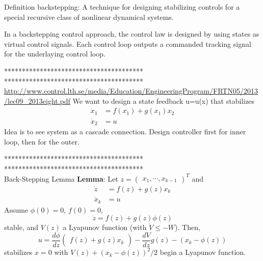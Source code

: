 Definition backstepping: A technique for designing stabilizing controls for a special recursive class of nonlinear dynamical systems.

In a backstepping control approach, the control law is designed by using states as virtual control signals. Each control loop outputs a commanded tracking signal for the underlaying control loop.

***************************************\\


***************************************\\
\url{http://www.control.lth.se/media/Education/EngineeringProgram/FRTN05/2013/lec09_2013eight.pdf}
We want to design a state feedback u=u(x) that stabilizes
\begin{equation}\label{key}
\begin{aligned}
\dot{x}_1&=f(x_1)+g(x_1)x_2\\
\dot{x}_2&=u
\end{aligned}
\end{equation}
Idea is to see system as a cascade connection. Design controller first for inner loop, then for the outer.

***************************************\\


***************************************\\
Back-Stepping Lemma
\textbf{Lemma}: Let $ z=\begin{pmatrix}x_1,\cdots,x_{k-1}\end{pmatrix}^T$ and 
\begin{equation}\label{key}
\begin{aligned}
\dot{z}&=f(z)+g(z)x_k\\
\dot{x}_k&=u
\end{aligned}
\end{equation}
Assume $ \phi(0)=0 $, $ f(0)=0 $,
\begin{equation}\label{key}
\dot{z}=f(z)+g(z)\phi(z)
\end{equation}
stable, and $ V(z) $ a Lyapunov function (with $ \dot{V}\leq-W $). Then, 
\begin{equation}\label{key}
u=\frac{d\phi}{dz}\begin{pmatrix}
f(z)+g(z)x_k
\end{pmatrix}-\frac{dV}{dz}g(z)-(x_k-\phi(z))
\end{equation}
stabilizes $ x=0 $ with $ V(z)+(x_k-\phi(z))^2/2 $ begin a Lyapunov function.

